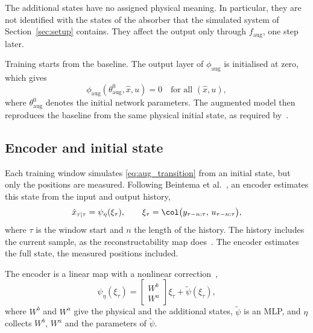 The additional states have no assigned physical meaning.
In particular, they are not identified with the states of the absorber that
the simulated system of Section~\ref{sec:setup} contains.
They affect the output only through $f_{\mathrm{aug}}$, one step later.

Training starts from the baseline.
The output layer of $\phi_{\mathrm{aug}}$ is initialised at zero, which gives
\begin{equation}
 \phi_{\mathrm{aug}}(\theta^0_{\mathrm{aug}},\hat x,u)=0
 \quad\text{for all }(\hat x,u),
 \label{eq:aug_zero_init}
\end{equation}
where $\theta^0_{\mathrm{aug}}$ denotes the initial network parameters.
The augmented model then reproduces the baseline from the same physical
initial state, as required by~\cite[Eq.~(29)]{hoekstra2026lfr}.

\subsection{Encoder and initial state}\label{sec:aug_encoder}
Each training window simulates \eqref{eq:aug_transition} from an initial
state, but only the positions are measured.
Following Beintema et al.~\cite{beintema2023subnet}, an encoder estimates
this state from the input and output history,
\begin{equation}
 \hat x_{\tau|\tau}
 =\psi_\eta(\xi_\tau),\qquad
 \xi_\tau=\col\bigl(y_{\tau-n:\tau},\,u_{\tau-n:\tau}\bigr),
 \label{eq:aug_encoder}
\end{equation}
where $\tau$ is the window start and $n$ the length of the history.
The history includes the current sample, as the reconstructability map
does~\cite[Eq.~(15)]{hoekstra2026encoder}.
The encoder estimates the full state, the measured positions included.

The encoder is a linear map with a nonlinear
correction~\cite[Eq.~(8)]{hoekstra2026encoder},
\begin{equation}
 \psi_\eta(\xi_\tau)
 =\begin{bmatrix}W^b\\ W^a\end{bmatrix}\xi_\tau+\tilde\psi(\xi_\tau),
 \label{eq:aug_enc_lin}
\end{equation}
where $W^b$ and $W^a$ give the physical and the additional states,
$\tilde\psi$ is an MLP, and $\eta$ collects $W^b$, $W^a$ and the parameters
of $\tilde\psi$.

